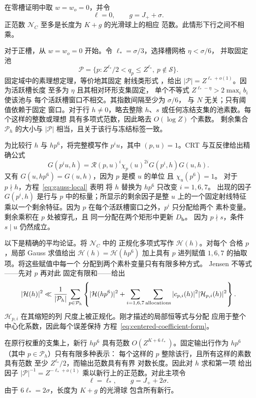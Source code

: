 在零槽证明中取 \(w=w_o=0\)，并令
\[
 \ell=0,\qquad g=J_++\sigma.
\]
正范数 \(\mathcal N_C\) 至多是长度为 \(K+g\) 的光滑球上的相应
范数。此情形下行之间不相乘。

对于正槽，从 \(w=w_o=0\) 开始。令
\(\ell_*=\sigma/3\)，选择槽网格 \(\eta<\sigma/6\)，
并取固定池
\[
 \mathcal P=\{p: Z^{\ell_*}/2<q_p\le Z^{\ell_*},\
                    p\notin\mathcal S\}.
\]
固定域中的素理想定理，等价地其固定
射线类形式 \cite[定理 1.1]{TZ}，给出
\(|\mathcal P|=Z^{\ell_*+o(1)}\)。因为活跃槽长度
至多为 \(\eta\) 且其相对环形支集固定，
单个不等式
\(Z^{\ell_*-\eta}>2\max_i b_i\) 使该池与
每个活跃槽窗口不相交。其指数间隔至少为 \(\sigma/6\)，
与 \(N\) 无关；只有阈值依赖于固定
窗口。对于行 \(h\ne0\)，略去整除
\(h\)、\(s\) 或任何冻结支集的池素数。每个这样的整数或理想
具有多项式范数，因此略去 \(O(\log Z)\) 个素数。
剩余集合 \(\mathcal P_h\) 的大小与
\(|\mathcal P|\) 相当，且关于该行与冻结标签一致。

为比较行 \(h\) 与 \(hp^6\)，将完整模写作 \(p^iu\)，其中
\((p,u)=1\)。CRT 与互反律给出精确公式
\[
 G(p^iu,h)
 =\mathcal R(p,u)^i\chi_p(u)^{2i}G(p^i,h)G(u,h).
\]
又有 \(G(u,hp^6)=G(u,h)\)，因为 \(p\) 是模 \(u\) 的单位
且 \(\chi_u(p^6)=1\)。
对于 \(p\nmid h\)，方程~\eqref{eq:gauss-local} 表明
将 \(h\) 替换为 \(hp^6\) 只改变 \(i=1,6,7\)。
出现的因子 \(G(p^i,h)\) 是行与
\(p\) 中的标量；所显示的剩余因子是整 \(u\) 上的一个固定射线特征
乘以一个剩余特征。因为 \(p\)
在每个活跃槽窗口之外，\(p^i\) 只分配给两个
素朴变量。剩余乘积在 \(p\) 处被穿孔，且
同一分配在两个矩形中更新 \(D_{\mathbf b}\)。
因为 \(p\nmid s\)，条件 \(s\mid u\) 仍然成立。

以下是精确的平均论证。将 \(\mathcal N_C\) 中的
正规化多项式写作 \(\mathcal H(h)\)。对每个
合格 \(p\)，局部 Gauss 求值给出
\(\mathcal H(h)=\mathcal H(hp^6)\) 加上具有
\(p\) 进列赋值 \(1,6,7\) 的抽取项。将这些赋值中每一个
分配到两个素朴变量只有有限多种方式。
Jensen 不等式——先对 \(p\) 再对此
固定有限和——给出
\[
 |\mathcal H(h)|^2\ll
 \frac1{|\mathcal P_h|}\sum_{p\in\mathcal P_h}
 \left\{|\mathcal H(hp^6)|^2+
        \sum_{i=1,6,7}\sum_{\rm allocations}
        |c_{p,i}(h)|^2|\mathcal H_{p,i}(h)|^2\right\}.
\]
\(\mathcal H_{p,i}\) 在其缩短的列
尺度上被正规化。刚才描述的局部恒等式与分配
应用于整个中心化系数，因此每个误差保持
方程~\eqref{eq:centered-coefficient-form}。

在原行权重的支集上，新行 \(hp^6\)
具有范数 \(O(Z^{K+6\ell_*})\)。固定输出行作为
\(hp^6\)（其中 \(p\in\mathcal P_h\)）只有有限多种表示：
每个这样的 \(p\) 整除该行，且所有这样的素数具有范数
至少 \(Z^{\ell_*}/2\)，而输出范数具有有界
对数长度。因此对 \(h\) 求和第一项
给出因子 \(|\mathcal P|^{-1}=Z^{-\ell_*+o(1)}\)
乘以新行上的正范数。对此主项令
\[
 \ell=\ell_*,\qquad g=J_++2\sigma.
\]
由于 \(6\ell_*=2\sigma\)，长度为 \(K+g\) 的光滑球
包含所有新行。

